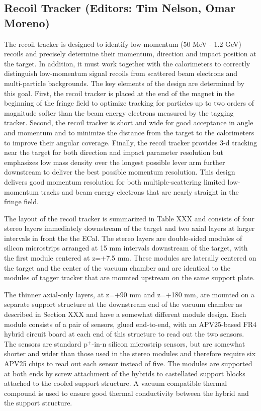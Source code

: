 
\subsection{Recoil Tracker (Editors: Tim Nelson, Omar Moreno)}

The recoil tracker is designed to identify low-momentum (50 MeV - 1.2 GeV) recoils and precisely determine their momentum, direction and impact position at the target.  In addition, it must work together with the calorimeters to correctly distinguish low-momentum signal recoils from scattered beam electrons and multi-particle backgrounds. The key elements of the design are determined by this goal.  First, the recoil tracker is placed at the end of the magnet in the beginning of the fringe field to optimize tracking for particles up to two orders of magnitude softer than the beam energy electrons measured by the tagging tracker.  Second, the recoil tracker is short and wide for good acceptance in angle and momentum and to minimize the distance from the target to the calorimeters to improve their angular coverage. Finally, the recoil tracker provides 3-d tracking near the target for both direction and impact parameter resolution but emphasizes low mass density over the longest possible lever arm further downstream to deliver the best possible momentum resolution.  This design delivers good momentum resolution for both multiple-scattering limited low-momentum tracks and beam energy electrons that are nearly straight in the fringe field.

The layout of the recoil tracker is summarized in Table XXX and consists of four stereo layers immediately downstream of the target and two axial layers at larger intervals in front the the ECal.  The stereo layers are double-sided modules of silicon microstrips arranged at 15 mm intervals downstream of the target, with the first module centered at z=+7.5 mm.  These modules are laterally centered on the target and the center of the vacuum chamber and are identical to the modules of tagger tracker that are mounted upstream on the same support plate.  

The thinner axial-only layers, at z=+90 mm and z=+180 mm, are mounted on a separate support structure at the downstream end of the vacuum chamber as described in Section XXX and have a somewhat different module design.  Each module consists of a pair of sensors, glued end-to-end, with an APV25-based FR4 hybrid circuit board at each end of this structure to read out the two sensors. The sensors are standard p$^{+}$-in-n silicon microstrip sensors, but are somewhat shorter and wider than those used in the stereo modules and therefore require six APV25 chips to read out each sensor instead of five. The modules are supported at both ends by screw attachment of the hybrids to castellated support blocks attached to the cooled support structure. A vacuum compatible thermal compound is used to ensure good thermal conductivity between the hybrid and the support structure.